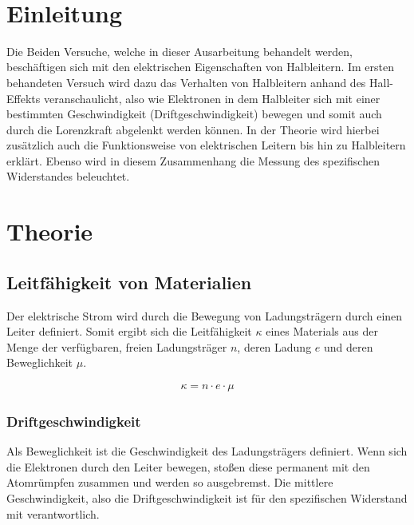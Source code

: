 \documentclass[a4paper]{scrartcl}
\def\header#1#2{
  \begin{center}
    {\Large #1}\\
    {#2}
  \end{center}
}
\numberwithin{equation}{subsection}
\begin{document}
\vspace{10pt}
\header{\HEADDING}{\SUBHEADDING}

\tableofcontents

\newpage

\section{Einleitung}
Die Beiden Versuche, welche in dieser Ausarbeitung behandelt werden, beschäftigen sich mit den elektrischen Eigenschaften von Halbleitern. Im ersten behandeten Versuch wird dazu das Verhalten von Halbleitern anhand des Hall-Effekts veranschaulicht, also wie Elektronen in dem Halbleiter sich mit einer bestimmten Geschwindigkeit (Driftgeschwindigkeit) bewegen und somit auch durch die Lorenzkraft abgelenkt werden können. In der Theorie wird hierbei zusätzlich auch die Funktionsweise von elektrischen Leitern bis hin zu Halbleitern erklärt.
Ebenso wird in diesem Zusammenhang die Messung des spezifischen Widerstandes beleuchtet.


\newpage

\section{Theorie}
\subsection{Leitfähigkeit von Materialien}
Der elektrische Strom wird durch die Bewegung von Ladungsträgern durch einen Leiter definiert.
Somit ergibt sich die Leitfähigkeit $\kappa$ eines Materials aus der Menge der verfügbaren, freien Ladungsträger $n$, deren Ladung $e$ und deren Beweglichkeit $\mu$. \cite{horn}

\begin{align}
\kappa = n \cdot e \cdot \mu
\end{align}

\subsubsection{Driftgeschwindigkeit}
Als Beweglichkeit ist die Geschwindigkeit des Ladungsträgers definiert. Wenn sich die Elektronen durch den Leiter bewegen, stoßen diese permanent mit den Atomrümpfen zusammen und werden so ausgebremst. Die mittlere Geschwindigkeit, also die Driftgeschwindigkeit ist für den spezifischen Widerstand mit verantwortlich. \cite{werk}
\end{document}
